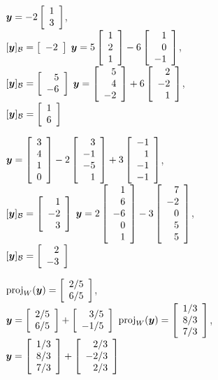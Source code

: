 
\begin{enumerate}[!HW!, start=1]
\begin{multicols}{3}
\itemspade $\bb y = -2\vr{1\\3}$,\\ $[\bb y]_\B = \vr{-2}$
\itemspade $\bb y = 5\vr{1\\2\\1}-6\vr{1\\0\\-1}$,\\ $[\bb y]_\B = \vr{5\\-6}$
\itemspade $\bb y = \vr{5\\4\\-2}+6\vr{2\\-2\\1}$,\\ $[\bb y]_\B = \vr{1\\6}$
\end{multicols}
\begin{multicols}{2}
\itemspade $\bb y = \vr{3\\4\\1\\0}-2\vr{3\\-1\\-5\\1}+3\vr{-1\\1\\-1\\-1}$,\\ $[\bb y]_\B = \vr{1\\-2\\3}$
\itemspade $\bb y = 2\vr{1\\6\\-6\\0\\1}-3\vr{7\\-2\\0\\5\\5}$,\\ $[\bb y]_\B = \vr{2\\-3}$
\end{multicols}
\begin{multicols}{3}
\itemspade $\proj_W(\bb y) = \vr{2/5 \\ 6/5}$,\\ $\bb  y = \vr{2/5 \\ 6/5} + \vr{3/5 \\ -1/5}$
\itemspade $\proj_W(\bb y)  = \vr{1/3\\8/3\\7/3}$,\\ $\bb y = \vr{1/3\\8/3\\7/3}+\vr{2/3\\-2/3\\2/3}$

\end{multicols}
\end{enumerate}
